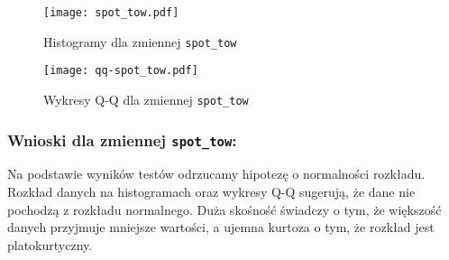 \documentclass[12pt,a4paper]{article}
\begin{document}
\begin{figure}[H]
    \centering
    \texttt{[image: spot\_tow.pdf]}
    \caption{Histogramy dla zmiennej \texttt{spot\_tow}}
\end{figure}

\begin{figure}[H]
    \centering
    \texttt{[image: qq-spot\_tow.pdf]}
    \caption{Wykresy Q-Q dla zmiennej \texttt{spot\_tow}}
\end{figure}

\subsubsection*{Wnioski dla zmiennej \texttt{spot\_tow}:}
Na podstawie wyników testów odrzucamy hipotezę o normalności rozkładu. Rozkład danych na histogramach oraz wykresy Q-Q sugerują, że dane nie pochodzą z rozkładu normalnego. Duża skośność świadczy o tym, że większość danych przyjmuje mniejsze wartości, a ujemna kurtoza o tym, że rozkład jest platokurtyczny.
\end{document}
